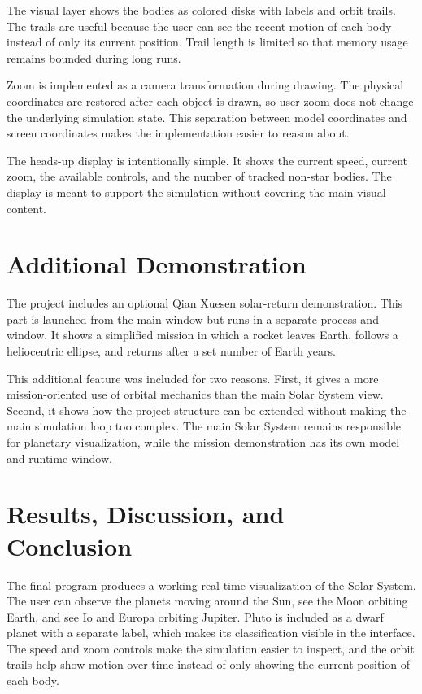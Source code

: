 \documentclass[a4paper,12pt]{article}
\begin{document}
The visual layer shows the bodies as colored disks with labels and orbit
trails. The trails are useful because the user can see the recent motion of
each body instead of only its current position. Trail length is limited so that
memory usage remains bounded during long runs.

Zoom is implemented as a camera transformation during drawing. The physical
coordinates are restored after each object is drawn, so user zoom does not
change the underlying simulation state. This separation between model
coordinates and screen coordinates makes the implementation easier to reason
about.

The heads-up display is intentionally simple. It shows the current speed,
current zoom, the available controls, and the number of tracked non-star
bodies. The display is meant to support the simulation without covering the
main visual content.

\section{Additional Demonstration}

The project includes an optional Qian Xuesen solar-return demonstration. This
part is launched from the main window but runs in a separate process and window.
It shows a simplified mission in which a rocket leaves Earth, follows a
heliocentric ellipse, and returns after a set number of Earth years.

This additional feature was included for two reasons. First, it gives a more
mission-oriented use of orbital mechanics than the main Solar System view.
Second, it shows how the project structure can be extended without making the
main simulation loop too complex. The main Solar System remains responsible for
planetary visualization, while the mission demonstration has its own model and
runtime window.

\section{Results, Discussion, and Conclusion}

The final program produces a working real-time visualization of the Solar
System. The user can observe the planets moving around the Sun, see the Moon
orbiting Earth, and see Io and Europa orbiting Jupiter. Pluto is included as a
dwarf planet with a separate label, which makes its classification visible in
the interface. The speed and zoom controls make the simulation easier to
inspect, and the orbit trails help show motion over time instead of only
showing the current position of each body.
\end{document}

